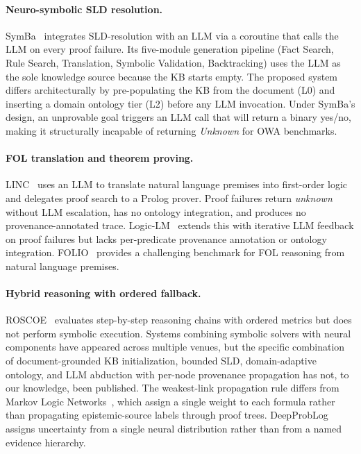 \documentclass[11pt,letterpaper]{article}
\begin{document}
\paragraph{Neuro-symbolic SLD resolution.}
SymBa~\citep{Baek2025} integrates SLD-resolution with an LLM via a coroutine that
calls the LLM on every proof failure. Its five-module generation pipeline (Fact Search, Rule Search, Translation, Symbolic
Validation, Backtracking) uses the LLM as the sole knowledge source because the KB starts empty. The proposed system differs
architecturally by pre-populating the KB from the document (L0) and inserting a domain ontology tier (L2) before any LLM
invocation. Under SymBa's design, an unprovable goal triggers an LLM call that will return a binary yes/no, making it
structurally incapable of returning \emph{Unknown} for OWA benchmarks.

\paragraph{FOL translation and theorem proving.}
LINC~\citep{Olausson2023} uses an LLM to translate natural language premises into first-order logic and delegates proof search to a Prolog prover.
Proof failures return \emph{unknown} without LLM escalation, has no ontology integration, and produces no provenance-annotated
trace. Logic-LM~\citep{Pan2023} extends this with iterative LLM feedback on proof failures but lacks per-predicate provenance annotation
or ontology integration. FOLIO~\citep{Han2022} provides a challenging benchmark for FOL reasoning from natural language premises.

\paragraph{Hybrid reasoning with ordered fallback.}
ROSCOE~\citep{Golovneva2022} evaluates step-by-step reasoning chains with ordered metrics but
does not perform symbolic execution. Systems combining symbolic solvers with neural components have appeared across multiple
venues, but the specific combination of document-grounded KB initialization, bounded SLD, domain-adaptive ontology, and
LLM abduction with per-node provenance propagation has not, to our knowledge, been published. The weakest-link propagation
rule differs from Markov Logic Networks~\citep{Richardson2006}, which assign a single weight to each formula rather than propagating epistemic-source
labels through proof trees. DeepProbLog~\citep{Manhaeve2018} assigns uncertainty from a single neural distribution rather than from a named
evidence hierarchy.
\end{document}
